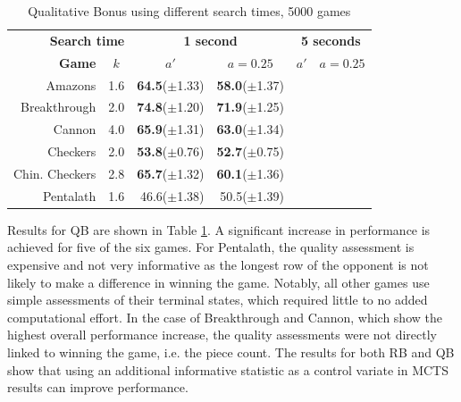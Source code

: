 \documentclass{ecai2014}
\begin{document}
\begin{table}
{\caption{Qualitative Bonus using different search times, 5000 games} \label{tab:qb}}
\begin{center}
\begin{tabular}{rlrrrr}
\hline
\multicolumn{2}{r}{\rule{0pt}{12pt}\textbf{Search time}} & \multicolumn{2}{c}{\textbf{1 second}} & \multicolumn{2}{c}{\textbf{5 seconds}} \\
\cline{1-6}
\rule{0pt}{12pt} \textbf{Game} & \multicolumn{1}{c|}{\textbf{$k$}} 
& \multicolumn{1}{c}{\textbf{$a'$}} & \multicolumn{1}{c}{\textbf{$a = 0.25$}} & \multicolumn{1}{c}{\textbf{$a'$}} & \multicolumn{1}{c}{\textbf{$a = 0.25$}} \\ \hline
Amazons &\multicolumn{1}{l|}{1.6}			& {\bf{64.5}}($\pm$1.33) & {\bf{58.0}}($\pm$1.37) 	&& \\
Breakthrough &\multicolumn{1}{l|}{2.0} 		& {\bf{74.8}}($\pm$1.20) & {\bf{71.9}}($\pm$1.25) 	&& \\
Cannon &\multicolumn{1}{l|}{4.0} 			& {\bf{65.9}}($\pm$1.31) & {\bf{63.0}}($\pm$1.34) 	&& \\
Checkers &\multicolumn{1}{l|}{2.0}			& {\bf{53.8}}($\pm$0.76) & {\bf{52.7}}($\pm$0.75) 	&& \\
Chin. Checkers &\multicolumn{1}{l|}{2.8} 	& {\bf{65.7}}($\pm$1.32) & {\bf{60.1}}($\pm$1.36) 	&& \\
Pentalath &\multicolumn{1}{l|}{1.6} 		& 46.6($\pm$1.38) 	     & 50.5($\pm$1.39) 			&& \\
\hline
\end{tabular}
\end{center}
\end{table}

Results for QB are shown in Table \ref{tab:qb}. A significant increase in performance is achieved for five of the six games. For Pentalath, the quality assessment is expensive and not very informative as the longest row of the opponent is not likely to make a difference in winning the game. Notably, all other games use simple assessments of their terminal states, which required little to no added computational effort. In the case of Breakthrough and Cannon, which show the highest overall performance increase, the quality assessments were not directly linked to winning the game, i.e. the piece count. The results for both RB and QB show that using an additional informative statistic as a control variate in MCTS results can improve performance.

\end{document}
